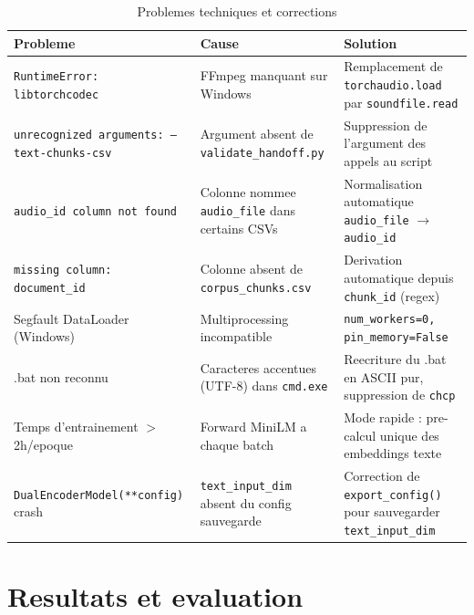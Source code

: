 \documentclass[12pt, a4paper]{article}
\begin{document}
\begin{table}[H]
\centering
\caption{Problemes techniques et corrections}
\begin{tabularx}{\linewidth}{p{4.5cm} p{3.5cm} X}
\toprule
\textbf{Probleme} & \textbf{Cause} & \textbf{Solution} \\
\midrule
\texttt{RuntimeError: libtorchcodec} &
FFmpeg manquant sur Windows &
Remplacement de \texttt{torchaudio.load} par \texttt{soundfile.read} \\

\rowcolor{silver}
\texttt{unrecognized arguments: --text-chunks-csv} &
Argument absent de \texttt{validate\_handoff.py} &
Suppression de l'argument des appels au script \\

\texttt{audio\_id column not found} &
Colonne nommee \texttt{audio\_file} dans certains CSVs &
Normalisation automatique \texttt{audio\_file} $\to$ \texttt{audio\_id} \\

\rowcolor{silver}
\texttt{missing column: document\_id} &
Colonne absent de \texttt{corpus\_chunks.csv} &
Derivation automatique depuis \texttt{chunk\_id} (regex) \\

Segfault DataLoader (Windows) &
Multiprocessing incompatible &
\texttt{num\_workers=0, pin\_memory=False} \\

\rowcolor{silver}
.bat non reconnu &
Caracteres accentues (UTF-8) dans \texttt{cmd.exe} &
Reecriture du .bat en ASCII pur, suppression de \texttt{chcp} \\

Temps d'entrainement $>$ 2h/epoque &
Forward MiniLM a chaque batch &
Mode rapide : pre-calcul unique des embeddings texte \\

\rowcolor{silver}
\texttt{DualEncoderModel(**config)} crash &
\texttt{text\_input\_dim} absent du config sauvegarde &
Correction de \texttt{export\_config()} pour sauvegarder \texttt{text\_input\_dim} \\

\bottomrule
\end{tabularx}
\end{table}

\newpage

\section{Resultats et evaluation}
\end{document}
